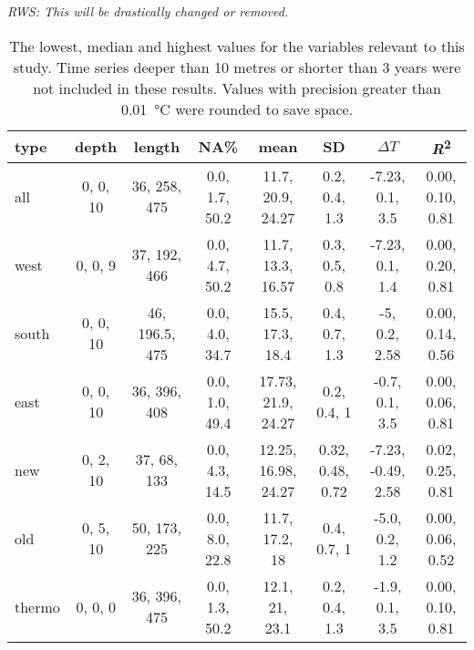 \documentclass{ametsoc}
\begin{document}
%
\emph{RWS: This will be drastically changed or removed.}
\begin{table}[ht]
\caption{\small The lowest, median and highest values for the variables relevant to this study. Time series deeper than 10 metres or shorter than 3 years were not included in these results. Values with precision greater than \SI{0.01}{\degreeCelsius} were rounded to save space.}
\label{range-table}
\centering
\tiny
\begin{tabular}{lccccccc}
\hline
 type & depth & length & NA\% & mean & SD & $\Delta T$ & \emph{R}\textsuperscript{2} \\
 \hline
  all & 0, 0, 10 & 36, 258, 475 & 0.0, 1.7, 50.2 & 11.7, 20.9, 24.27 & 0.2, 0.4, 1.3 & -7.23, 0.1, 3.5 & 0.00, 0.10, 0.81 \\
  west & 0, 0, 9 & 37, 192, 466 & 0.0, 4.7, 50.2 & 11.7, 13.3, 16.57 & 0.3, 0.5, 0.8 & -7.23, 0.1, 1.4 & 0.00, 0.20, 0.81 \\
  south & 0, 0, 10 & 46, 196.5, 475 & 0.0, 4.0, 34.7 & 15.5, 17.3, 18.4 & 0.4, 0.7, 1.3 & -5, 0.2, 2.58 & 0.00, 0.14, 0.56 \\
  east & 0, 0, 10 & 36, 396, 408 & 0.0, 1.0, 49.4 & 17.73, 21.9, 24.27 & 0.2, 0.4, 1 & -0.7, 0.1, 3.5 & 0.00, 0.06, 0.81 \\
  new & 0, 2, 10 & 37, 68, 133 & 0.0, 4.3, 14.5 & 12.25, 16.98, 24.27 & 0.32, 0.48, 0.72 & -7.23, -0.49, 2.58 & 0.02, 0.25, 0.81 \\
  old & 0, 5, 10 & 50, 173, 225 & 0.0, 8.0, 22.8 & 11.7, 17.2, 18 & 0.4, 0.7, 1 & -5.0, 0.2, 1.2 & 0.00, 0.06, 0.52 \\
  thermo & 0, 0, 0 & 36, 396, 475 & 0.0, 1.3, 50.2 & 12.1, 21, 23.1 & 0.2, 0.4, 1.3 & -1.9, 0.1, 3.5 & 0.00, 0.10, 0.81 \\
  \hline
  \end{tabular}
\end{table}
\end{document}

